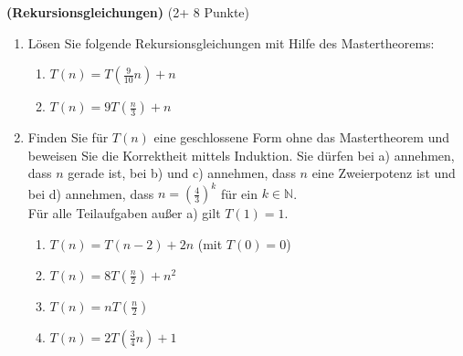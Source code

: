\documentclass{article}
\begin{document}
  \quad\textbf{(Rekursionsgleichungen)} \quad(2+ 8 Punkte)
\begin{enumerate}
\item Lösen Sie folgende Rekursionsgleichungen mit Hilfe des Mastertheorems:
  \begin{enumerate}
  \item $T(n)=T\left(\frac{9}{10} n\right) + n$
  \item $T(n)=9   T\left(\frac{n}{3}\right) + n$
  \end{enumerate}
\item Finden Sie für $T(n)$ eine geschlossene Form ohne das Mastertheorem und beweisen Sie die Korrektheit mittels Induktion. Sie dürfen bei a) annehmen, dass $n$ gerade ist, bei b)  und c)
 annehmen, dass $n$ eine Zweierpotenz ist und bei d) annehmen, dass $n=(\frac{4}{3})^k$ für ein $k \in \mathbb N$.\\
Für alle Teilaufgaben außer a) gilt $T(1)=1$.
  \begin{enumerate}
  \item $T(n) = T(n-2) + 2n$ (mit $T(0)=0$)
  \item $T(n)=8 T\left(\frac{n}{2}\right) + n^2$
  \item $T(n)=n T\left(\frac{n}{2}\right)$
  \item $T(n) = 2T(\frac{3}{4}n) + 1$
  \end{enumerate}
\end{enumerate}
\end{document}
